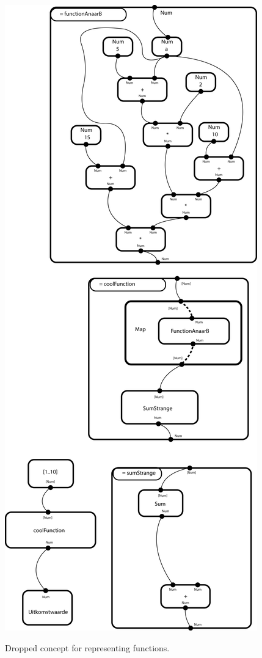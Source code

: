 \begin{figure}[p]
	\centering
	\includegraphics[scale=0.5]{Images/voorbeeldprogramma4.png}
	\label{fig:example-program-4}
	\caption{Dropped concept for representing functions.}
\end{figure}
